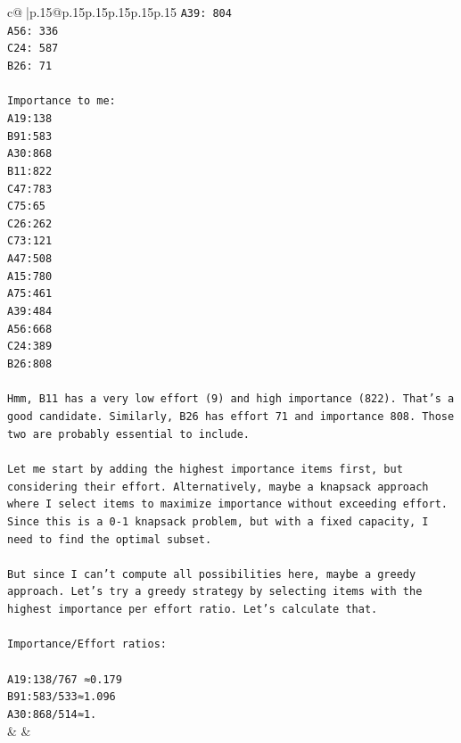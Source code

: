 \documentclass{article}
\begin{document}
{\begin{supertabular}{c@{$\;$}|p{.15\linewidth}@{}p{.15\linewidth}p{.15\linewidth}p{.15\linewidth}p{.15\linewidth}p{.15\linewidth}}
{{{\texttt{A39: 804} \\
\texttt{A56: 336} \\
\texttt{C24: 587} \\
\texttt{B26: 71} \\
\\ 
\texttt{Importance to me:} \\
\texttt{A19:138} \\
\texttt{B91:583} \\
\texttt{A30:868} \\
\texttt{B11:822} \\
\texttt{C47:783} \\
\texttt{C75:65} \\
\texttt{C26:262} \\
\texttt{C73:121} \\
\texttt{A47:508} \\
\texttt{A15:780} \\
\texttt{A75:461} \\
\texttt{A39:484} \\
\texttt{A56:668} \\
\texttt{C24:389} \\
\texttt{B26:808} \\
\\ 
\texttt{Hmm, B11 has a very low effort (9) and high importance (822). That's a good candidate. Similarly, B26 has effort 71 and importance 808. Those two are probably essential to include.} \\
\\ 
\texttt{Let me start by adding the highest importance items first, but considering their effort. Alternatively, maybe a knapsack approach where I select items to maximize importance without exceeding effort. Since this is a 0{-}1 knapsack problem, but with a fixed capacity, I need to find the optimal subset.} \\
\\ 
\texttt{But since I can't compute all possibilities here, maybe a greedy approach. Let's try a greedy strategy by selecting items with the highest importance per effort ratio. Let's calculate that.} \\
\\ 
\texttt{Importance/Effort ratios:} \\
\\ 
\texttt{A19:138/767 ≈0.179} \\
\texttt{B91:583/533≈1.096} \\
\texttt{A30:868/514≈1.} \\
            }
        }
    }
    & & \\ \\


\end{supertabular}}
\end{document}
